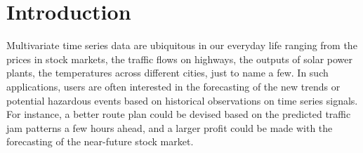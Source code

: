 \section{Introduction}
\label{sec:intro}

Multivariate time series data are ubiquitous in our everyday life ranging from the prices in stock markets, the traffic flows on highways, the outputs of solar power plants, the temperatures across different cities, just to name a few. In such applications, users are often interested in the forecasting of the new trends or potential hazardous events based on historical observations on time series signals. For instance, a better route plan could be devised based on the predicted traffic jam patterns a few hours ahead, and a larger profit could be made with the forecasting of the near-future stock market. %

